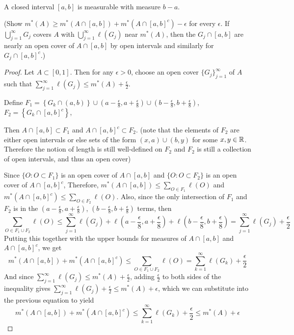 \begin{pblm}%
	A closed interval $[a,b]$ is measurable with measure $b-a$. 

	(Show $m^\ast(A) \ge m^\ast(A\cap[a,b])+m^\ast(A\cap[a,b]^c)-\epsilon$ 
	for every $\epsilon$. If $\bigcup\limits_{j=1}^\infty G_j$ covers $A$ 
	with $\bigcup\limits_{j=1}^\infty \ell(G_j)$ near $m^\ast(A)$, then the 
	$G_j\cap[a,b]$ are nearly an open cover of $A\cap[a,b]$ by open intervals 
	and similarly for $G_j\cap[a,b]^c$.)
\vspace{.25cm}

\begin{proof}
	Let $A \subset [0,1]$. Then 
	for any $\epsilon > 0$, choose an open cover $\{G_j\}_{j=1}^\infty$ of $A$ 
	such that $\sum\limits_{j=1}^\infty \ell(G_j) \le m^\ast(A) + \frac{\epsilon}{2}$. 

	Define $F_1 = \left\{G_k \cap (a, b) \right\}
		\cup (a-\frac{\epsilon}{8},a+\frac{\epsilon}{8})
		\cup (b-\frac{\epsilon}{8},b+\frac{\epsilon}{8})$, 
	$F_2 = \left\{G_k \cap [a, b]^c\right\}$, 

	Then $A \cap [a, b] \subset F_1$ and $A \cap [a, b]^c \subset F_2$. 
	(note that the elements of $F_2$ are either open intervals or else 
	sets of the form $(x, a) \cup (b, y)$ for some $x, y \in \mathbb{R}$.
	Therefore the notion of length is still well-defined on $F_2$ and $F_2$ 
	is still a collection of open intervals, and thus an open cover) 

	Since $\{O: O \subset F_1\}$ is an open cover of $A \cap [a, b]$ and 
	$\{O: O \subset F_2\}$ is an open cover of $A \cap [a, b]^c$, 
	Therefore, 
	$m^\ast(A \cap [a,b]) \le \sum\limits_{O \in F_1}\ell(O)$ and 
	$m^\ast(A \cap [a,b]^c) \le \sum\limits_{O \in F_2}\ell(O)$. 
	Also, since the only intersection of $F_1$ and $F_2$ is in the 
	$(a - \frac{\epsilon}{8}, a + \frac{\epsilon}{8})$, $(b - \frac{\epsilon}{8}, b + \frac{\epsilon}{8})$ 
	terms, then 
	\begin{equation*}
		\sum\limits_{O \in F_1 \cup F_2} \ell(O) 
		\le \sum\limits_{j = 1}^\infty \ell(G_j) + 
		\ell(a-\frac{\epsilon}{8},a+\frac{\epsilon}{8}) + \ell(b-\frac{\epsilon}{8},b+\frac{\epsilon}{8}) 
		= \sum\limits_{j=1}^\infty\ell(G_j)+\frac{\epsilon}{2}
	\end{equation*}
	Putting this together with the upper bounds for measures of $A \cap [a, b]$ and $A \cap [a, b]^c$, we get 
	\begin{equation*}
	m^\ast(A \cap [a,b]) + m^\ast(A \cap [a,b]^c) \le 
	\sum\limits_{O \in F_1 \cup F_2} \ell(O) = 
	\sum\limits_{k=1}^\infty \ell(G_k) + \frac{\epsilon}{2} 
	\end{equation*}
	And since $\sum\limits_{j=1}^\infty\ell(G_j) \le m^\ast(A) + \frac{\epsilon}{2}$, adding $\frac{\epsilon}{2}$ to 
	both sides of the inequality gives 
	$\sum\limits_{j=1}^\infty\ell(G_j) + \frac{\epsilon}{2} \le m^\ast(A) + \epsilon$, which we can substitute 
	into the previous equation to yield 
	\begin{equation*}
	m^\ast(A \cap [a,b]) + m^\ast(A \cap [a,b]^c) \le 
	\sum\limits_{k=1}^\infty \ell(G_k) + \frac{\epsilon}{2} 
	\le m^\ast(A) + \epsilon
	\end{equation*}


\end{proof}
\end{pblm}
